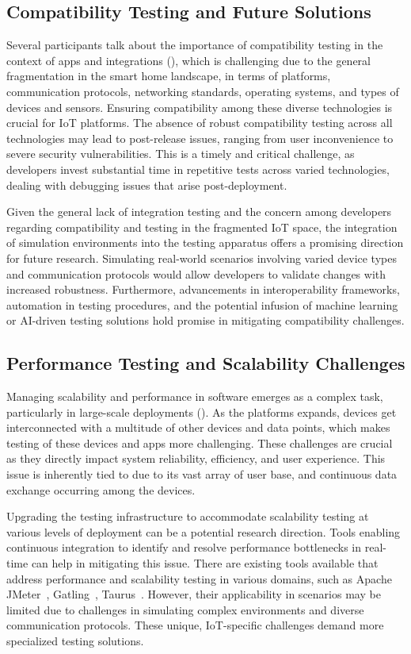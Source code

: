 \subsection{Compatibility Testing and Future Solutions}
Several participants talk about the importance of compatibility testing in the context of \iot apps and integrations (), which is challenging due to the general fragmentation in the smart home landscape, in terms of platforms, communication protocols, networking standards, operating systems, and types of devices and sensors. 
Ensuring compatibility among these diverse technologies is crucial for IoT platforms.  
The absence of robust compatibility testing across all technologies may lead to post-release issues, ranging from user inconvenience to severe security vulnerabilities. This is a timely and critical challenge, as developers invest substantial time in repetitive tests across varied technologies, dealing with debugging issues that arise post-deployment.


Given the general lack of integration testing and the concern among developers regarding compatibility and testing in the fragmented IoT space, the integration of simulation environments into the testing apparatus offers a promising direction for future research. 
Simulating real-world scenarios involving varied device types and communication protocols would allow developers to validate changes with increased robustness. Furthermore, advancements in \iot interoperability frameworks, automation in testing procedures, and the potential infusion of machine learning or AI-driven testing solutions hold promise in mitigating compatibility challenges.

\subsection{Performance Testing and Scalability Challenges}
Managing scalability and performance in \iot software emerges as a complex task, particularly in large-scale deployments (). As the \iot platforms expands, devices get interconnected with a multitude of other devices and data points, which makes testing of these devices and apps more challenging. These challenges are crucial as they directly impact system reliability, efficiency, and user experience. This issue is inherently tied to \iot due to its vast array of user base, and continuous data exchange occurring among the devices. 

Upgrading the testing infrastructure to accommodate scalability testing at various levels of deployment can be a potential research direction. 
Tools enabling continuous integration to identify and resolve performance bottlenecks in real-time can help in mitigating this issue. There are existing tools available that address performance and scalability testing in various domains, such as Apache JMeter~\cite{halili2008apache}, Gatling~\cite{gatling}, Taurus~\cite{taurus}. However, their applicability in \iot scenarios may be limited due to challenges in simulating complex \iot environments and diverse communication protocols. These unique, IoT-specific challenges demand more specialized testing solutions.

